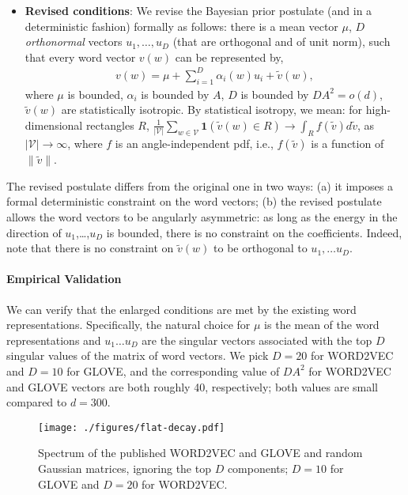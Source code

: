 \documentclass{article} \usepackage{acl2017,times}
\begin{document}
\begin{itemize}
\item{\bf Revised conditions}: We revise the Bayesian prior postulate (and in a deterministic fashion) formally as follows:  there is a mean vector $\mu$, $D$ {\em orthonormal} vectors $u_1,\ldots ,u_D$ (that are orthogonal and of unit norm), such that  every word vector $v(w)$ can be represented by,
    \begin{align}
      v(w) = \mu + \sum_{i=1}^D \alpha_i (w) u_i  + \tilde{v}(w), \label{eq:word-vec}
    \end{align}
    where $\mu$ is bounded, $\alpha_i$ is bounded by $A$, $D$ is bounded by $DA^2 = o(d)$, $\tilde{v}(w)$ are statistically isotropic. By statistical isotropy, we mean: for  high-dimensional rectangles $R$, $\frac{1}{|\mathcal{V}|}\sum_{w\in \mathcal{V}} \mathbf{1}(\tilde{v}(w) \in  R) \to \int_R f(\tilde{v}) d\tilde{v}$, as $|\mathcal{V}|\to \infty$, where $f$ is an angle-independent pdf, i.e., $f(\tilde{v})$ is a function of $\|\tilde{v}\|$. 
\end{itemize}

The revised postulate differs from the original one in two ways: (a) it imposes a formal deterministic constraint on the word vectors;   (b) 
the revised postulate allows the word vectors to be angularly asymmetric: as long as the energy in the direction of $u_1$,\ldots,$u_D$ is bounded, there is no constraint on the coefficients. Indeed, note that  there is no constraint on  $\tilde{v}(w)$ to be orthogonal to  $u_1,\ldots u_D$.  


\paragraph{Empirical Validation}  We can verify  that  the enlarged  conditions are  met by  the  existing word representations.  Specifically, the natural choice for $\mu$ is the mean of the word representations and $u_1 \ldots u_D$ are the singular vectors associated with the top $D$ singular values of the matrix of word vectors. We pick $D=20$ for WORD2VEC and $D = 10$ for GLOVE, and the corresponding value of $DA^2$ for WORD2VEC and GLOVE vectors are both roughly  40, respectively; both values are small compared to  $d = 300$. 


\begin{figure}[!h]
\centering
\texttt{[image: ./figures/flat-decay.pdf]}
\caption{Spectrum of the published WORD2VEC and GLOVE and  random Gaussian matrices, ignoring the top $D$ components; $D = 10$ for GLOVE and $D=20$ for  WORD2VEC.}
\label{app:fig:decay}
\end{figure}
\end{document}
